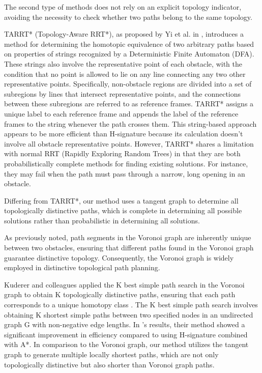 \documentclass[letterpaper, 10 pt, journal, twoside]{IEEEtran}
\begin{document}
The second type of methods does not rely on an explicit topology indicator, avoiding the necessity to check whether two paths belong to the same topology.

TARRT* (Topology-Aware RRT*), as proposed by Yi et al. in \cite{19}, introduces a method for determining the homotopic equivalence of two arbitrary paths based on properties of strings recognized by a Deterministic Finite Automaton (DFA). These strings also involve the representative point of each obstacle, with the condition that no point is allowed to lie on any line connecting any two other representative points. Specifically, non-obstacle regions are divided into a set of subregions by lines that intersect representative points, and the connections between these subregions are referred to as reference frames. TARRT* assigns a unique label to each reference frame and appends the label of the reference frames to the string whenever the path crosses them. This string-based approach appears to be more efficient than H-signature because its calculation doesn't involve all obstacle representative points. However, TARRT* shares a limitation with normal RRT (Rapidly Exploring Random Trees) in that they are both probabilistically complete methods for finding existing solutions. For instance, they may fail when the path must pass through a narrow, long opening in an obstacle.


Differing from TARRT*, our method uses a tangent graph to determine all topologically distinctive paths, which is complete in determining all possible solutions rather than probabilistic in determining all solutions.

As previously noted, path segments in the Voronoi graph are inherently unique between two obstacles, ensuring that different paths found in the Voronoi graph guarantee distinctive topology. Consequently, the Voronoi graph is widely employed in distinctive topological path planning.

Kuderer and colleagues applied the K best simple path search \cite{katoh1982efficient} in the Voronoi graph to obtain K topologically distinctive paths, ensuring that each path corresponds to a unique homotopy class \cite{kuderer2014online}. The K best simple path search involves obtaining K shortest simple paths between two specified nodes in an undirected graph G with non-negative edge lengths. In \cite{kuderer2014online}'s results, their method showed a significant improvement in efficiency compared to using H-signature combined with A*. In comparison to the Voronoi graph, our method utilizes the tangent graph \cite{8, 10} to generate multiple locally shortest paths, which are not only topologically distinctive but also shorter than Voronoi graph paths. 
\end{document}

